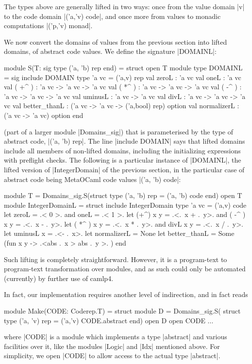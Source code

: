 \documentclass{elsart}
\begin{document}
\noindent  The types above are
generally lifted in two ways: once from the value domain |v| to the code
domain |('a,'v) code|, and once more from values to monadic computations
|('p,'v) monad|. 

We now convert the domains of values from the previous section into
lifted domains, of abstract code values. We define the signature
|DOMAINL|:
\begin{code}
module S(T: sig type ('a, 'b) rep  end) = struct
open T
module type DOMAINL = sig
  include DOMAIN
  type 'a vc = ('a,v) rep
  val zeroL : 'a vc
  val oneL  : 'a vc
  val ( +^ ) : 'a vc -> 'a vc -> 'a vc
  val ( *^ ) : 'a vc -> 'a vc -> 'a vc
  val ( -^ ) : 'a vc -> 'a vc -> 'a vc
  val uminusL : 'a vc -> 'a vc
  val divL    : 'a vc -> 'a vc -> 'a vc
  val better_thanL : ('a vc -> 'a vc -> ('a,bool) rep) option
  val normalizerL  : ('a vc -> 'a vc) option
end 
\end{code}
(part of a larger module |Domains_sig|) that is parameterised by
the type of abstract code, |('a, 'b) rep|. The line |include DOMAIN|
says that lifted domains include all members of non-lifted domains,
including the initializing expressions with preflight checks.
The following is a particular instance of |DOMAINL|, the lifted
version of |IntegerDomain| of the previous section, in the particular
case of abstract code being MetaOCaml code values |('a, 'b) code|:
\begin{code}
module T = Domains_sig.S(struct type ('a, 'b) rep = ('a, 'b) code end)
open T
module IntegerDomainL = struct
    include IntegerDomain
    type 'a vc = ('a,v) code
    let zeroL = .< 0 >.  and oneL = .< 1 >. 
    let (+^) x y = .<.~x + .~y>. and ( -^ ) x y = .<.~x - .~y>.
    let ( *^ ) x y = .<.~x * .~y>. and divL x y = .<.~x / .~y>. 
    let uminusL x = .<- .~x>.
    let normalizerL = None
    let better_thanL = Some (fun x y -> .<abs .~x > abs .~y >. )
end
\end{code}
Such lifting is completely straightforward.  However, it is a
program-text to program-text transformation over modules, and as such could
only be automated (currently) by further use of camlp4.

In fact, our implementation requires another level of indirection, and
in fact reads
\begin{code}
module Make(CODE: Coderep.T) = struct
  module D = Domains_sig.S(
      struct type ('a, 'v) rep = ('a,'v) CODE.abstract 
    end)
open D
open CODE
...
\end{code}
where |CODE| is a module which implements a type |abstract| and various
facilities over it, like the modules |Logic| and |Idx| mentioned above.
For simplicity, we open |CODE| to allow access to the actual type |abstract|.
\end{document}
